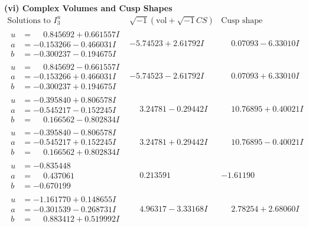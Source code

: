 \documentclass[1p]{elsarticle_modified}
\theoremstyle{definition}
\newcommand{\I}{\sqrt{-1}}
\begin{document}
\newpage\flushleft \textbf{(vi) Complex Volumes and Cusp Shapes}
$$\begin{array}{c|c|c}  
\text{Solutions to }I^u_{3}& \I (\text{vol} + \sqrt{-1}CS) & \text{Cusp shape}\\
 \hline 
\begin{aligned}
u &= \phantom{-}0.845692 + 0.661557 I \\
a &= -0.153266 - 0.466031 I \\
b &= -0.300237 - 0.194675 I\end{aligned}
 & -5.74523 + 2.61792 I & \phantom{-}0.07093 - 6.33010 I \\ \hline\begin{aligned}
u &= \phantom{-}0.845692 - 0.661557 I \\
a &= -0.153266 + 0.466031 I \\
b &= -0.300237 + 0.194675 I\end{aligned}
 & -5.74523 - 2.61792 I & \phantom{-}0.07093 + 6.33010 I \\ \hline\begin{aligned}
u &= -0.395840 + 0.806578 I \\
a &= -0.545217 - 0.152245 I \\
b &= \phantom{-}0.166562 - 0.802834 I\end{aligned}
 & \phantom{-}3.24781 - 0.29442 I & \phantom{-}10.76895 + 0.40021 I \\ \hline\begin{aligned}
u &= -0.395840 - 0.806578 I \\
a &= -0.545217 + 0.152245 I \\
b &= \phantom{-}0.166562 + 0.802834 I\end{aligned}
 & \phantom{-}3.24781 + 0.29442 I & \phantom{-}10.76895 - 0.40021 I \\ \hline\begin{aligned}
u &= -0.835448\phantom{ +0.000000I} \\
a &= \phantom{-}0.437061\phantom{ +0.000000I} \\
b &= -0.670199\phantom{ +0.000000I}\end{aligned}
 & \phantom{-}0.213591\phantom{ +0.000000I} & -1.61190\phantom{ +0.000000I} \\ \hline\begin{aligned}
u &= -1.161770 + 0.148655 I \\
a &= -0.301539 - 0.268731 I \\
b &= \phantom{-}0.883412 + 0.519992 I\end{aligned}
 & \phantom{-}4.96317 - 3.33168 I & \phantom{-}2.78254 + 2.68060 I \\ \hline\begin{aligned}

\end{aligned}
\end{array}$$
\end{document}
